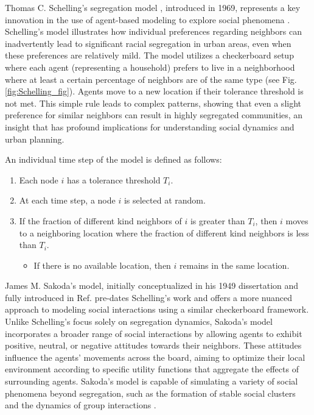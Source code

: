 Thomas C. Schelling's segregation model \cite{schelling-1969}, introduced in 1969, represents a key innovation in the use of agent-based modeling to explore social phenomena \cite{hegselmann-2017}. Schelling's model illustrates how individual preferences regarding neighbors can inadvertently lead to significant racial segregation in urban areas, even when these preferences are relatively mild. The model utilizes a checkerboard setup where each agent (representing a household) prefers to live in a neighborhood where at least a certain percentage of neighbors are of the same type (see Fig. \ref{fig:Schelling_fig}). Agents move to a new location if their tolerance threshold is not met. This simple rule leads to complex patterns, showing that even a slight preference for similar neighbors can result in highly segregated communities, an insight that has profound implications for understanding social dynamics and urban planning.

\begin{theorem}
    An individual time step of the model is defined as follows:
    \begin{enumerate}
        \item Each node $i$ has a tolerance threshold $T_i$.
        \item At each time step, a node $i$ is selected at random.
        \item If the fraction of different kind neighbors of $i$ is greater than $T_i$, then $i$ moves to a neighboring location where the fraction of different kind neighbors is less than $T_i$.
            \begin{itemize}
                \item If there is no available location, then $i$ remains in the same location.
            \end{itemize}
    \end{enumerate}
\end{theorem}

James M. Sakoda's model, initially conceptualized in his 1949 dissertation and fully introduced in Ref. \cite{sakoda1971checkerboard} pre-dates Schelling's work and offers a more nuanced approach to modeling social interactions using a similar checkerboard framework. Unlike Schelling's focus solely on segregation dynamics, Sakoda's model incorporates a broader range of social interactions by allowing agents to exhibit positive, neutral, or negative attitudes towards their neighbors. These attitudes influence the agents' movements across the board, aiming to optimize their local environment according to specific utility functions that aggregate the effects of surrounding agents. Sakoda's model is capable of simulating a variety of social phenomena beyond segregation, such as the formation of stable social clusters and the dynamics of group interactions \cite{hegselmann-2017}. 


